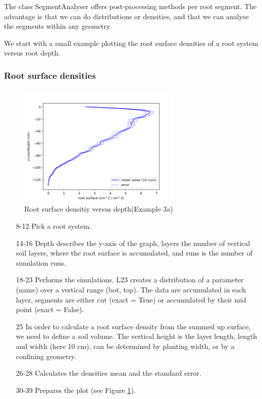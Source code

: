 

The class SegmentAnalyser offers post-processing methods per root segment. The advantage is that we can do distributions or densities, and that we can analyse the segments within any geometry. 

We start with a small example plotting the root surface densities of a root system versus root depth.

\subsubsection*{Root surface densities}



\begin{figure}
\centering
\includegraphics[width=0.7\textwidth]{example_3c.png}
\caption{Root surface densitiy versus depth(Example 3a)} \label{fig:surface_density}
\end{figure}


\begin{itemize}

\item[8-12] Pick a root system.
\item[14-16] Depth describes the y-axis of the graph, layers the number of vertical soil layers, where the root surface is accumulated, and runs is the number of simulation runs. 
\item[18-23] Performs the simulations. L23 creates a distribution of a parameter (name) over a vertical range (bot, top). The data are accumulated in each layer, segments are either cut (exact = True) or accumulated by their mid point (exact = False). 
\item[25] In order to calculate a root surface density from the summed up surface, we need to define a soil volume. The vertical height is the layer length, length and width (here 10 cm), can be determined by planting width, or by a confining geometry. 
\item[26-28] Calculates the densities mean and the standard error. 
\item[30-39] Prepares the plot (see Figure \ref{fig:surface_density}).

\end{itemize}



